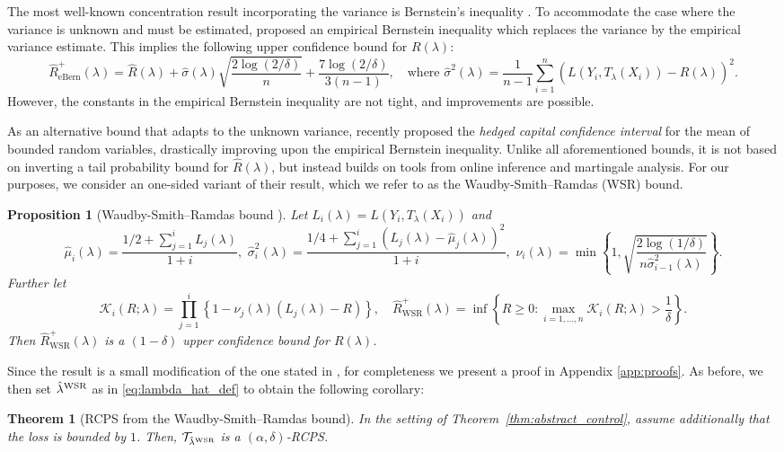 \documentclass[10pt]{article}
\newtheorem{theorem}{Theorem}
\newtheorem{prop}{Proposition}
\newcommand{\T}{\mathcal{T}}
\newcommand{\lhat}{\hat{\lambda}}
\newcommand{\Rhat}{\widehat{R}}
\begin{document}
The most well-known concentration result incorporating the variance is Bernstein's inequality \citep{bernstein1924modification}. To accommodate the case where the variance is unknown and must be estimated, \cite{maurer2009empirical} proposed an empirical Bernstein inequality which replaces the variance by the empirical variance estimate. This implies the following upper confidence bound for $R(\lambda)$:
\begin{equation}\label{eq:eBern}
\Rhat_{\mathrm{eBern}}^+(\lambda) = \Rhat(\lambda) +  \hat{\sigma}(\lambda)\sqrt{\frac{2\log (2 / \delta)}{n}} + \frac{7\log (2 / \delta)}{3(n - 1)}, \quad \text{where }\hat{\sigma}^2(\lambda) = \frac{1}{n-1}\sum_{i=1}^{n}(L(Y_i, T_\lambda(X_i)) - \Rhat(\lambda))^2.
\end{equation}
However, the constants in the empirical Bernstein inequality are not tight, and improvements are possible.

As an alternative bound that adapts to the unknown variance, \cite{waudby2020variance} recently proposed the \emph{hedged capital confidence interval} for the mean of bounded random variables, drastically improving upon the empirical Bernstein inequality. Unlike all aforementioned bounds, it is not based on inverting a tail probability bound for $\Rhat(\lambda)$, but instead builds on tools from online inference and martingale analysis. 
For our purposes, we consider an one-sided variant of their result, which we refer to as the Waudby-Smith--Ramdas (WSR) bound. 

\begin{prop}[Waudby-Smith--Ramdas bound \cite{waudby2020variance}]\label{prop:WSR}
Let $L_i(\lambda) = L(Y_i, T_\lambda(X_i))$ and 
$$
\hat{\mu}_i(\lambda) = \frac{1/2 + \sum_{j=1}^{i}L_{j}(\lambda)}{1 + i}, \,\, \hat{\sigma}_i^2(\lambda) = \frac{1/4 + \sum_{j=1}^{i}(L_{j}(\lambda) - \hat{\mu}_{j}(\lambda))^2}{1 + i}, \,\, \nu_{i}(\lambda) = \min\left\{1, \sqrt{\frac{2\log(1 / \delta)}{n\hat{\sigma}_{i-1}^2(\lambda)}}\right\}.
$$
Further let 
$$
\mathcal{K}_i(R; \lambda) = \prod_{j=1}^{i}\left\{1 - \nu_j(\lambda) (L_j(\lambda) - R)\right\}, \quad \Rhat_{\mathrm{WSR}}^+(\lambda) = \inf\left\{R \ge 0: \max_{i = 1,\ldots, n}\mathcal{K}_i(R; \lambda) > \frac{1}{\delta}\right\}.
$$
Then $\Rhat_{\mathrm{WSR}}^+(\lambda)$ is a $(1 - \delta)$ upper confidence bound for $R(\lambda)$.
\end{prop}
Since the result is a small modification of the one stated in \cite{waudby2020variance}, for completeness we present a proof in Appendix \ref{app:proofs}.
As before, we then set $\lhat^{{\rm WSR}}$ as in \eqref{eq:lambda_hat_def} to obtain the following corollary:
\begin{theorem}[RCPS from the Waudby-Smith--Ramdas bound]\label{thm:WSR}
    In the setting of Theorem~\ref{thm:abstract_control}, assume additionally that the loss is bounded by $1$. Then, $\T_{\lhat^{{\rm WSR}}}$ is a $(\alpha,\delta)$-RCPS.
\end{theorem}
\end{document}
